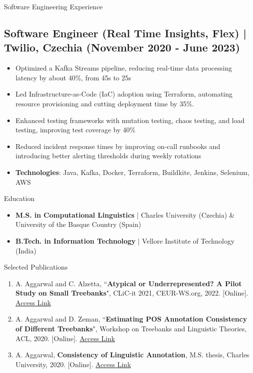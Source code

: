 \documentclass{resume} %
\begin{document}
\begin{rSection}{Software Engineering Experience}
    \subsection*{Software Engineer (Real Time Insights, Flex) | Twilio, Czechia (November 2020 - June 2023)}
        \begin{itemize}
            \item Optimized a Kafka Streams pipeline, reducing real-time data processing latency by about 40\%, from 45s to 25s
            \item Led Infrastructure-as-Code (IaC) adoption using Terraform, automating resource provisioning and cutting deployment time by 35\%.
            \item Enhanced testing frameworks with mutation testing, chaos testing, and load testing, improving test coverage by 40\%
            \item Reduced incident response times by improving on-call runbooks and introducing better alerting thresholds during weekly rotations
            \item \textbf{Technologies}: Java, Kafka, Docker, Terraform, Buildkite, Jenkins, Selenium, AWS 
        \end{itemize}
\end{rSection}

\begin{rSection}{Education}
    \begin{itemize}
        \item \textbf{M.S. in Computational Linguistics} | Charles University (Czechia) \& University of the Basque Country (Spain)
        \item \textbf{B.Tech. in Information Technology} | Vellore Institute of Technology (India)
    \end{itemize}
\end{rSection}

\begin{rSection}{Selected Publications}
    \begin{enumerate}
        \item A. Aggarwal and C. Alzetta, ``\textbf{Atypical or Underrepresented? A Pilot Study on Small Treebanks}", CLiC-it 2021, CEUR-WS.org, 2022. [Online]. {\href{http://ceur-ws.org/Vol-3033/paper78.pdf}{Access Link}}
        \item A. Aggarwal and D. Zeman, ``\textbf{Estimating POS Annotation Consistency of Different Treebanks}", Workshop on Treebanks and Linguistic Theories, ACL, 2020. [Online]. \href{https://www.aclweb.org/anthology/2020.tlt-1.9}{Access Link}
        \item A. Aggarwal, \textbf{Consistency of Linguistic Annotation}, M.S. thesis, Charles University, 2020. [Online]. \href{https://dspace.cuni.cz/handle/20.500.11956/120867}{Access Link}
    \end{enumerate}
\end{rSection}
\end{document}
